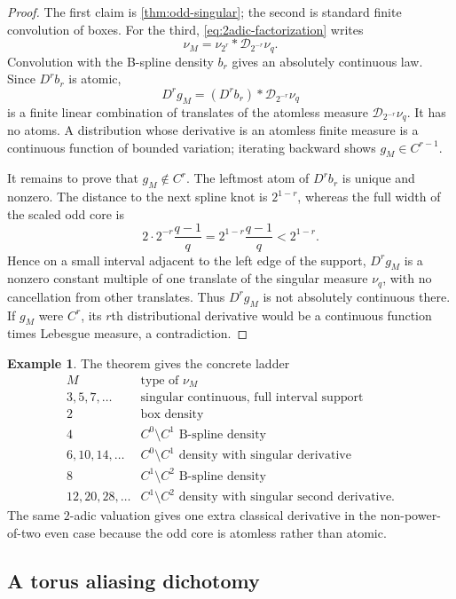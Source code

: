 \documentclass[11pt,oneside]{article}
\theoremstyle{definition}
\newtheorem{example}[theorem]{Example}
\theoremstyle{remark}
\numberwithin{equation}{section}
\newcommand{\D}{\mathcal D}
\newcommand{\1}{\mathbf 1}
\begin{document}
\begin{proof}
The first claim is \cref{thm:odd-singular}; the second is standard finite convolution of
boxes.  For the third, \eqref{eq:2adic-factorization} writes
\[
 \nu_M=\nu_{2^r}*\D_{2^{-r}}\nu_q.
\]
Convolution with the B-spline density $b_r$ gives an absolutely continuous law.  Since
$D^r b_r$ is atomic,
\[
 D^r g_M=(D^r b_r)*\D_{2^{-r}}\nu_q
\]
is a finite linear combination of translates of the atomless measure
$\D_{2^{-r}}\nu_q$.  It has no atoms.  A distribution whose derivative is an atomless
finite measure is a continuous function of bounded variation; iterating backward shows
$g_M\in C^{r-1}$.

It remains to prove that $g_M\notin C^r$.  The leftmost atom of $D^r b_r$ is unique and
nonzero.  The distance to the next spline knot is $2^{1-r}$, whereas the full width of the
scaled odd core is
\[
 2\cdot 2^{-r}\frac{q-1}{q}=2^{1-r}\frac{q-1}{q}<2^{1-r}.
\]
Hence on a small interval adjacent to the left edge of the support, $D^r g_M$ is a
nonzero constant multiple of one translate of the singular measure $\nu_q$, with no
cancellation from other translates.  Thus $D^r g_M$ is not absolutely continuous there.
If $g_M$ were $C^r$, its $r$th distributional derivative would be a continuous function
times Lebesgue measure, a contradiction.
\end{proof}

\begin{example}
The theorem gives the concrete ladder
\[
\begin{array}{c|c}
M&\text{type of }\nu_M\\ \hline
3,5,7,\ldots&\text{singular continuous, full interval support}\\
2&\text{box density}\\
4& C^0\setminus C^1\text{ B-spline density}\\
6,10,14,\ldots& C^0\setminus C^1\text{ density with singular derivative}\\
8& C^1\setminus C^2\text{ B-spline density}\\
12,20,28,\ldots& C^1\setminus C^2\text{ density with singular second derivative}.
\end{array}
\]
The same $2$-adic valuation gives one extra classical derivative in the non-power-of-two
even case because the odd core is atomless rather than atomic.
\end{example}

\subsection{A torus aliasing dichotomy}
\end{document}
